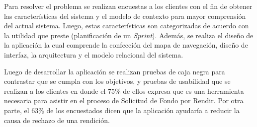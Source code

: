 \begin{resumen}

    Para resolver el problema se realizan encuestas a los clientes con el fin de obtener las características del sistema y el modelo de contexto para mayor comprensión del actual sistema. Luego, estas características son categorizadas de acuerdo con la utilidad que preste (planificación de un \emph{Sprint}). Además, se realiza el diseño de la aplicación la cual comprende la confección del mapa de navegación, diseño de interfaz, la arquitectura y el modelo relacional del sistema.

    

    Luego de desarrollar la aplicación se realizan pruebas de caja negra para contrastar que se cumpla con los objetivos, y pruebas de usabilidad que se realizan a los clientes en donde el 75\% de ellos expresa que es una herramienta necesaria para asistir en el proceso de Solicitud de Fondo por Rendir. Por otra parte, el 63\% de los encuestados dicen que la aplicación ayudaría a reducir la causa de rechazo de una rendición.

    
    

\end{resumen}
